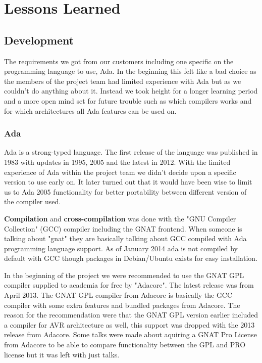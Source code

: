 \section{Lessons Learned}\label{sec:lessons_learned}

\subsection{Development}
The requirements we got from our customers including one specific on the
programming language to use, Ada. In the beginning this felt like a bad choice
as the members of the project team had limited experience with Ada but as we
couldn't do anything about it. Instead we took height for a longer learning
period and a more open mind set for future trouble such as which compilers works
and for which architectures all Ada features can be used on.

\subsubsection{Ada}
Ada is a strong-typed language. The first release of the language was published
in 1983 with updates in 1995, 2005 and the latest in 2012. With the limited
experience of Ada within the project team we didn't decide upon a specific version
to use early on. It later turned out that it would have been wise to limit us to
Ada 2005 functionality for better portability between different version of
the compiler used.

\textbf{Compilation} and \textbf{cross-compilation} was done with the
"GNU Compiler Collection" (GCC) compiler including the GNAT frontend. When
someone is talking about "gnat" they are basically talking about GCC compiled
with Ada programming language support. As of January 2014 ada is not compiled
by default with GCC though packages in Debian/Ubuntu exists for easy installation.

In the beginning of the project we were recommended to use the GNAT GPL compiler
supplied to academia for free by "Adacore". The latest release was from April
2013. The GNAT GPL compiler from Adacore is basically the GCC compiler with
some extra features and bundled packages from Adacore. The reason for the
recommendation were that the GNAT GPL version earlier included a compiler for
AVR architecture as well, this support was dropped with the 2013 release from
Adacore. Some talks were made about aquiring a GNAT Pro License from Adacore to
be able to compare functionality between the GPL and PRO license but it was left
with just talks.

